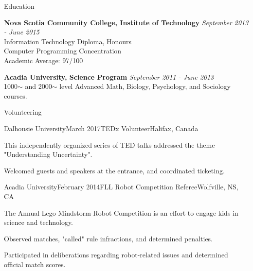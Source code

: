 \documentclass{resume} %
\begin{document}
\pagebreak



\begin{rSection}{Education}

{\bf Nova Scotia Community College, Institute of Technology} \hfill {\em September 2013 - June 2015} \\ 
Information Technology Diploma, Honours \\
Computer Programming Concentration \smallskip \\
Academic Average: 97/100

{\bf Acadia University, Science Program} \hfill {\em September 2011 - June 2013} \\ 
1000$\sim$ and 2000$\sim$ level Advanced Math, Biology, Psychology, and Sociology courses.\\

\end{rSection}



\begin{rSection}{Volunteering}


\begin{rSubsection}{Dalhousie University}{March 2017}{TEDx Volunteer}{Halifax, Canada}

\item[] This independently organized series of TED talks addressed the theme "Understanding Uncertainty".\smallskip


\item Welcomed guests and speakers at the entrance, and coordinated ticketing.
\end{rSubsection}

\begin{rSubsection}{Acadia University}{February 2014}{FLL Robot Competition Referee}{Wolfville, NS, CA}

\item[] The Annual Lego Mindstorm Robot Competition is an effort to engage kids in science and technology.\smallskip

\item Observed matches, "called" rule infractions, and determined penalties. 
\item Participated in deliberations regarding robot-related issues and determined official match scores.
\end{rSubsection}

\end{rSection}
\end{document}
